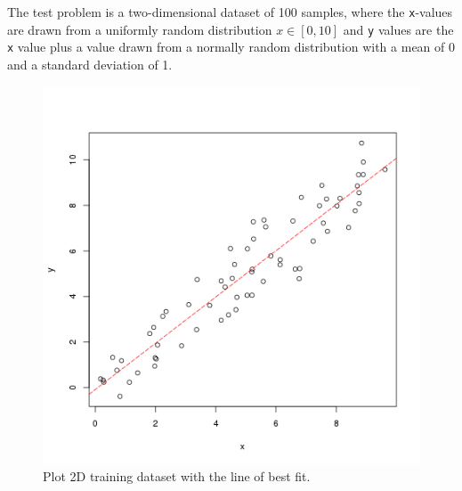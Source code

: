 The test problem is a two-dimensional dataset of 100 samples, where the \texttt{x}-values are drawn from a uniformly random distribution $x \in [0,10]$ and \texttt{y} values are the \texttt{x} value plus a value drawn from a normally random distribution with a mean of 0 and a standard deviation of 1.




\begin{figure}[htp]
\centering
\includegraphics[scale=0.45]{book/a_regression/ordinary_least_squares_regression_result.png}
\caption{Plot 2D training dataset with the line of best fit.}
\label{plot:ordinary_least_squares_regression_result}
\end{figure}



